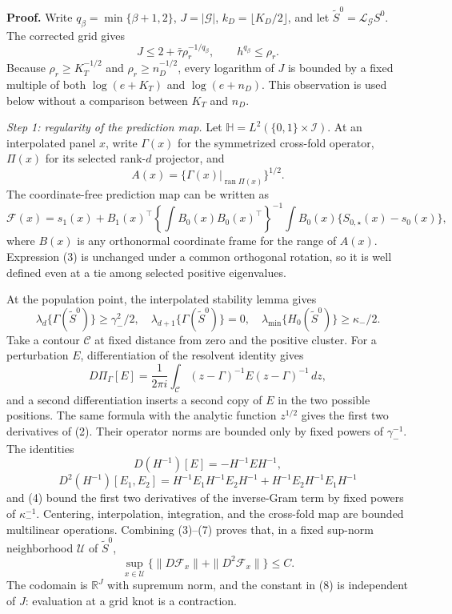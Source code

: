 \textbf{Proof.}
Write \(q_\beta=\min\{\beta+1,2\}\), \(J=|\mathcal G|\),
\(k_D=\lfloor K_D/2\rfloor\), and let
\(\widetilde S^0=\mathcal L_{\mathcal G}S^0\).  The corrected grid gives
\[
 J\le2+\bar\tau\rho_r^{-1/q_\beta},
 \qquad h^{q_\beta}\le\rho_r.                             \tag{1}
\]
Because \(\rho_r\ge K_T^{-1/2}\) and
\(\rho_r\ge n_D^{-1/2}\), every logarithm of \(J\) is bounded by a fixed
multiple of both \(\log(e+K_T)\) and \(\log(e+n_D)\).  This observation is
used below without a comparison between \(K_T\) and \(n_D\).

\emph{Step 1: regularity of the prediction map.}
Let \(\mathbb H=L^2(\{0,1\}\times\mathcal I)\).  At an interpolated
panel \(x\), write \(\Gamma(x)\) for the symmetrized cross-fold operator,
\(\Pi(x)\) for its selected rank-\(d\) projector, and
\[
 A(x)=\{\Gamma(x)|_{\operatorname{ran}\Pi(x)}\}^{1/2}.     \tag{2}
\]
The coordinate-free prediction map can be written as
\[
 \mathcal F(x)
 =s_1(x)+B_1(x)^\top
 \left\{\int B_0(x)B_0(x)^\top\right\}^{-1}
 \int B_0(x)\{S_{0,\star}(x)-s_0(x)\},                    \tag{3}
\]
where \(B(x)\) is any orthonormal coordinate frame for the range of
\(A(x)\).  Expression (3) is unchanged under a common orthogonal rotation,
so it is well defined even at a tie among selected positive eigenvalues.

At the population point, the interpolated stability lemma gives
\[
 \lambda_d\{\Gamma(\widetilde S^0)\}\ge\gamma_-^2/2,
 \quad \lambda_{d+1}\{\Gamma(\widetilde S^0)\}=0,
 \quad \lambda_{\min}\{H_0(\widetilde S^0)\}\ge\kappa_-/2. \tag{4}
\]
Take a contour \(\mathscr C\) at fixed distance from zero and the positive
cluster.  For a perturbation \(E\), differentiation of the resolvent
identity gives
\[
 D\Pi_\Gamma[E]
 =\frac1{2\pi i}\int_{\mathscr C}
 (z-\Gamma)^{-1}E(z-\Gamma)^{-1}\,dz,                     \tag{5}
\]
and a second differentiation inserts a second copy of \(E\) in the two
possible positions.  The same formula with the analytic function
\(z^{1/2}\) gives the first two derivatives of (2).  Their operator norms
are bounded only by fixed powers of \(\gamma_-^{-1}\).  The identities
\[
 D(H^{-1})[E]=-H^{-1}EH^{-1},                               \tag{6}
\]
\[
 D^2(H^{-1})[E_1,E_2]
 =H^{-1}E_1H^{-1}E_2H^{-1}
  +H^{-1}E_2H^{-1}E_1H^{-1}                               \tag{7}
\]
and (4) bound the first two derivatives of the inverse-Gram term by fixed
powers of \(\kappa_-^{-1}\).  Centering, interpolation, integration, and
the cross-fold map are bounded multilinear operations.  Combining
(3)--(7) proves that, in a fixed sup-norm neighborhood \(\mathcal U\) of
\(\widetilde S^0\),
\[
 \sup_{x\in\mathcal U}\{\|D\mathcal F_x\|+\|D^2\mathcal F_x\|\}
 \le C.                                                      \tag{8}
\]
The codomain is \(\mathbb R^J\) with supremum norm, and the constant in
(8) is independent of \(J\): evaluation at a grid knot is a contraction.

